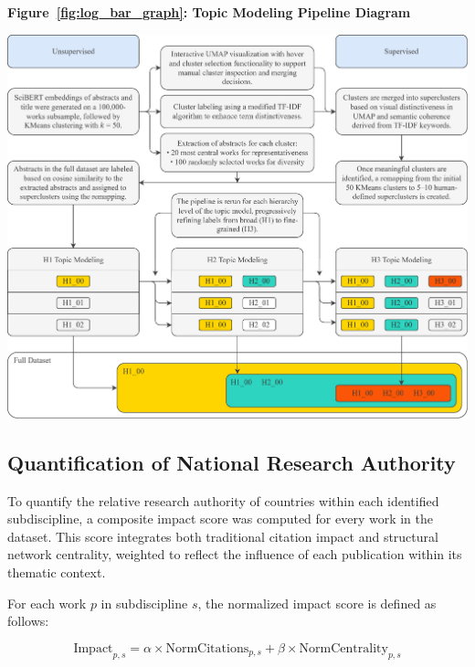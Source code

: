 \documentclass{article}
\begin{document}
\clearpage
\onecolumn          %
\begin{center}
	{\large\textbf{Figure~\ref{fig:log_bar_graph}: Topic Modeling Pipeline Diagram}}
	\vspace{1em}
\end{center}

\includegraphics[width=\textwidth]{topic_modeling_pipeline_diagram.pdf}
\label{fig:log_bar_graph}

\twocolumn          %



\subsection{Quantification of National Research Authority}

To quantify the relative research authority of countries within each identified subdiscipline, a composite impact score was computed for every work in the dataset. This score integrates both traditional citation impact and structural network centrality, weighted to reflect the influence of each publication within its thematic context.

For each work \( p \) in subdiscipline \( s \), the normalized impact score is defined as follows:

\begin{equation}
	\text{Impact}_{p,s} = \alpha \times \text{NormCitations}_{p,s} + \beta \times \text{NormCentrality}_{p,s}
\end{equation}
\end{document}
